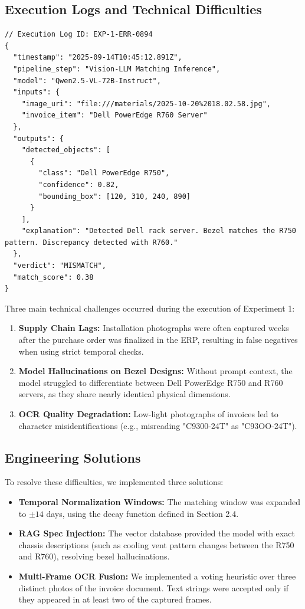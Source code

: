 \documentclass[11pt,letterpaper]{report}
\begin{document}
\subsection{Execution Logs and Technical Difficulties}

\begin{listing}[htbp]
\begin{verbatim}
// Execution Log ID: EXP-1-ERR-0894
{
  "timestamp": "2025-09-14T10:45:12.891Z",
  "pipeline_step": "Vision-LLM Matching Inference",
  "model": "Qwen2.5-VL-72B-Instruct",
  "inputs": {
    "image_uri": "file:///materials/2025-10-20%2018.02.58.jpg",
    "invoice_item": "Dell PowerEdge R760 Server"
  },
  "outputs": {
    "detected_objects": [
      {
        "class": "Dell PowerEdge R750",
        "confidence": 0.82,
        "bounding_box": [120, 310, 240, 890]
      }
    ],
    "explanation": "Detected Dell rack server. Bezel matches the R750 pattern. Discrepancy detected with R760."
  },
  "verdict": "MISMATCH",
  "match_score": 0.38
}
\end{verbatim}
\caption{System execution log showing a detected model mismatch (R750 vs R760) which prevented a potential billing discrepancy.}
\label{lst:log_mismatch}
\end{listing}

Three main technical challenges occurred during the execution of Experiment 1:
\begin{enumerate}
    \item \textbf{Supply Chain Lags:} Installation photographs were often captured weeks after the purchase order was finalized in the ERP, resulting in false negatives when using strict temporal checks.
    \item \textbf{Model Hallucinations on Bezel Designs:} Without prompt context, the model struggled to differentiate between Dell PowerEdge R750 and R760 servers, as they share nearly identical physical dimensions.
    \item \textbf{OCR Quality Degradation:} Low-light photographs of invoices led to character misidentifications (e.g., misreading "C9300-24T" as "C93OO-24T").
\end{enumerate}

\subsection{Engineering Solutions}
To resolve these difficulties, we implemented three solutions:
\begin{itemize}
    \item \textbf{Temporal Normalization Windows:} The matching window was expanded to $\pm 14$ days, using the decay function defined in Section 2.4.
    \item \textbf{RAG Spec Injection:} The vector database provided the model with exact chassis descriptions (such as cooling vent pattern changes between the R750 and R760), resolving bezel hallucinations.
    \item \textbf{Multi-Frame OCR Fusion:} We implemented a voting heuristic over three distinct photos of the invoice document. Text strings were accepted only if they appeared in at least two of the captured frames.
\end{itemize}
\end{document}
